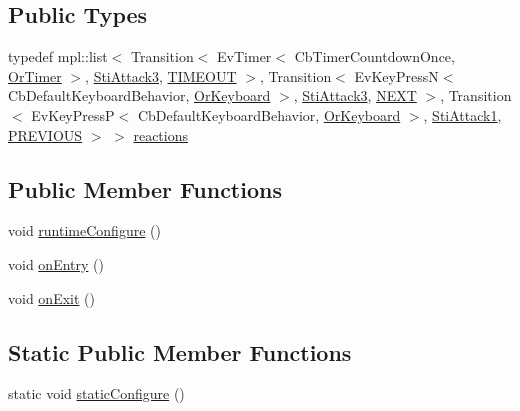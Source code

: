 \subsection*{Public Types}
\begin{DoxyCompactItemize}
\item 
typedef mpl\+::list$<$ Transition$<$ Ev\+Timer$<$ Cb\+Timer\+Countdown\+Once, \hyperlink{classsm__starcraft__ai_1_1OrTimer}{Or\+Timer} $>$, \hyperlink{structsm__starcraft__ai_1_1attack__inner__states_1_1StiAttack3}{Sti\+Attack3}, \hyperlink{structsm__starcraft__ai_1_1attack__inner__states_1_1StiAttack2_1_1TIMEOUT}{T\+I\+M\+E\+O\+UT} $>$, Transition$<$ Ev\+Key\+PressN$<$ Cb\+Default\+Keyboard\+Behavior, \hyperlink{classsm__starcraft__ai_1_1OrKeyboard}{Or\+Keyboard} $>$, \hyperlink{structsm__starcraft__ai_1_1attack__inner__states_1_1StiAttack3}{Sti\+Attack3}, \hyperlink{structsm__starcraft__ai_1_1attack__inner__states_1_1StiAttack2_1_1NEXT}{N\+E\+XT} $>$, Transition$<$ Ev\+Key\+PressP$<$ Cb\+Default\+Keyboard\+Behavior, \hyperlink{classsm__starcraft__ai_1_1OrKeyboard}{Or\+Keyboard} $>$, \hyperlink{structsm__starcraft__ai_1_1attack__inner__states_1_1StiAttack1}{Sti\+Attack1}, \hyperlink{structsm__starcraft__ai_1_1attack__inner__states_1_1StiAttack2_1_1PREVIOUS}{P\+R\+E\+V\+I\+O\+US} $>$ $>$ \hyperlink{structsm__starcraft__ai_1_1attack__inner__states_1_1StiAttack2_a978f087e297634bc2e93830ee485a799}{reactions}
\end{DoxyCompactItemize}
\subsection*{Public Member Functions}
\begin{DoxyCompactItemize}
\item 
void \hyperlink{structsm__starcraft__ai_1_1attack__inner__states_1_1StiAttack2_a301b74115e7af337d1f3883eb800a7a6}{runtime\+Configure} ()
\item 
void \hyperlink{structsm__starcraft__ai_1_1attack__inner__states_1_1StiAttack2_aaf86dde2442f2d91ffeae296f74c6120}{on\+Entry} ()
\item 
void \hyperlink{structsm__starcraft__ai_1_1attack__inner__states_1_1StiAttack2_a8d8c4c3b9e45a7dd8994bd22da3e2aaa}{on\+Exit} ()
\end{DoxyCompactItemize}
\subsection*{Static Public Member Functions}
\begin{DoxyCompactItemize}
\item 
static void \hyperlink{structsm__starcraft__ai_1_1attack__inner__states_1_1StiAttack2_ab86bb635738bb7d4d85d663203c8c2d9}{static\+Configure} ()
\end{DoxyCompactItemize}
